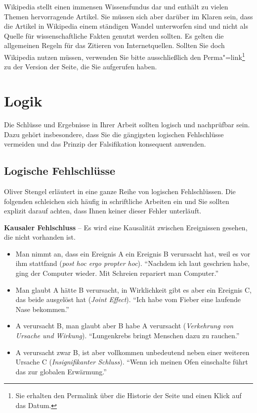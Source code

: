 \documentclass[a4paper,11pt,headings=normal]{scrartcl}
\begin{document}
Wikipedia stellt einen immensen Wissensfundus dar und enthält zu vielen Themen hervorragende Artikel. Sie müssen sich aber darüber im Klaren sein, dass die Artikel in Wikipedia einem ständigen Wandel unterworfen sind und nicht als Quelle für wissenschaftliche Fakten genutzt werden sollten. Es gelten die allgemeinen Regeln für das Zitieren von Internetquellen. Sollten Sie doch Wikipedia nutzen müssen, verwenden Sie bitte ausschließlich den Perma"=link\footnote{Sie erhalten den Permalink über die Historie der Seite und einen Klick auf das Datum.} zu der Version der Seite, die Sie aufgerufen haben.


\section{Logik}

Die Schlüsse und Ergebnisse in Ihrer Arbeit sollten logisch und nachprüfbar sein. Dazu gehört insbesondere, dass Sie die gängigsten logischen Fehlschlüsse vermeiden und das Prinzip der Falsifikation konsequent anwenden.

\subsection{Logische Fehlschlüsse}
Oliver Stengel erläutert in \cite{Stengel2005} eine ganze Reihe von logischen Fehlschlüssen. Die folgenden schleichen sich häufig in schriftliche Arbeiten ein und Sie sollten explizit darauf achten, dass Ihnen keiner dieser Fehler unterläuft.

\vspace{0.3cm}\noindent\textbf{Kausaler Fehlschluss} -- Es wird eine Kausalität zwischen Ereignissen gesehen, die nicht vorhanden ist.
  \begin{itemize}
     \item Man nimmt an, dass ein Ereignis A ein Ereignis B verursacht hat, weil es vor ihm stattfand (\textit{post hoc ergo propter hoc}). "`Nachdem ich laut geschrien habe, ging der Computer wieder. Mit Schreien repariert man Computer."'
     \item Man glaubt A hätte B verursacht, in Wirklichkeit gibt es aber ein Ereignis C, das beide ausgelöst hat (\textit{Joint Effect}). "`Ich habe vom Fieber eine laufende Nase bekommen."'
     \item A verursacht B, man glaubt aber B habe A verursacht (\textit{Verkehrung von Ursache und Wirkung}). "`Lungenkrebs bringt Menschen dazu zu rauchen."'
     \item A verursacht zwar B, ist aber vollkommen unbedeutend neben einer weiteren Ursache C (\textit{Insignifikanter Schluss}). "`Wenn ich meinen Ofen einschalte führt das zur globalen Erwärmung."'
  \end{itemize}
\end{document}
